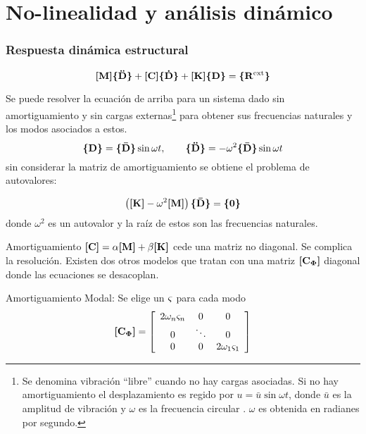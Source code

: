 
\part{No-linealidad y análisis dinámico}

\section{Respuesta dinámica estructural}

\begin{equation} \label{eq:ecuacionDinamicaGeneral}
	\boldsymbol{[}\mathbf{M} \boldsymbol{]}\boldsymbol{\{ }\mathbf{\boldsymbol{\ddot{\mathrm{D}}}} \boldsymbol{\}} + \boldsymbol{[}\mathbf{C} \boldsymbol{]}\boldsymbol{\{ }\mathbf{\boldsymbol{\dot{\mathrm{D}}}} \boldsymbol{\}}+\boldsymbol{[}\mathbf{K} \boldsymbol{]} \boldsymbol{\{ }\mathbf{D} \boldsymbol{\}} =\boldsymbol{\{ }\mathbf{R^{\mathrm{ext}}} \boldsymbol{\}}
\end{equation}

Se puede resolver la ecuación de arriba para un sistema dado sin amortiguamiento y sin cargas externas\footnote{Se denomina vibración ``libre'' cuando no hay cargas asociadas. Si no hay amortiguamiento el desplazamiento es regido por $u= \bar{u}\sin \omega t$, donde $\bar{u}$ es la amplitud de vibración y $\omega$ es la frecuencia circular \cite{cook2007concepts}. $\omega$ es obtenida en radianes por segundo.} para obtener sus frecuencias naturales y los modos asociados a estos.
\[
\boldsymbol{\{ }\mathbf{D} \boldsymbol{\}} = \boldsymbol{\{ }\mathbf{\boldsymbol{\bar{\mathrm D}}} \boldsymbol{\}}\sin \omega t, \qquad \boldsymbol{\{ }\mathbf{\boldsymbol{\ddot{\mathrm{D}}}} \boldsymbol{\}}= -\omega^2 \boldsymbol{\{ }\mathbf{\boldsymbol{\bar{\mathrm D}}} \boldsymbol{\}} \sin \omega t
\]
sin considerar la matriz de amortiguamiento se obtiene el problema de autovalores:

\[
\left( \boldsymbol{[}\mathbf{K} \boldsymbol{]} - \omega^2 \boldsymbol{[}\mathbf{M} \boldsymbol{]} \right)\boldsymbol{\{ }\mathbf{\boldsymbol{\bar{\mathrm D}}} \boldsymbol{\}} = \boldsymbol{\{ }\mathbf{0} \boldsymbol{\}}
\]
donde $\omega^2$ es un autovalor y la raíz de estos son las frecuencias naturales.




Amortiguamiento $\boldsymbol{[}\mathbf{C} \boldsymbol{]} = \alpha \boldsymbol{[}\mathbf{M} \boldsymbol{]}+\beta \boldsymbol{[}\mathbf{K} \boldsymbol{]}$ cede una matriz no diagonal. Se complica la resolución. Existen dos otros modelos que tratan con una matriz $\boldsymbol{[}\mathbf{C{_{\boldsymbol{\Phi}}}} \boldsymbol{]}$ diagonal donde las ecuaciones se desacoplan.


Amortiguamiento Modal: Se elige un $\varsigma$ para cada modo
\begin{equation}
\boldsymbol{[}\mathbf{C{_{\boldsymbol{\Phi}}}} \boldsymbol{]}=\left[ \begin{array}{ccc}{2 \omega_{n} \varsigma_{n}} & {0} & {0} \\ {0} & {\ddots} & {0} \\ {0} & {0} & {2 \omega_{1} \varsigma_{1}}\end{array}\right]
\end{equation}

